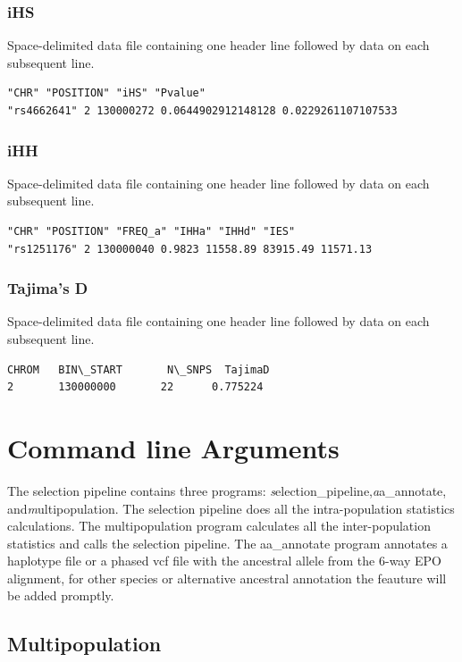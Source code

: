 \subsubsection{iHS}
Space-delimited data file containing one header line followed by data on each subsequent line.\\
\begin{verbatim}
"CHR" "POSITION" "iHS" "Pvalue"
"rs4662641" 2 130000272 0.0644902912148128 0.0229261107107533
\end{verbatim}
\subsubsection{iHH}
Space-delimited data file containing one header line followed by data on each subsequent line.\\
\begin{verbatim}
"CHR" "POSITION" "FREQ_a" "IHHa" "IHHd" "IES"
"rs1251176" 2 130000040 0.9823 11558.89 83915.49 11571.13
\end{verbatim}
\subsubsection{Tajima's D}
Space-delimited data file containing one header line followed by data on each subsequent line.\\
\begin{verbatim}
CHROM   BIN\_START       N\_SNPS  TajimaD
2       130000000       22      0.775224
\end{verbatim}

\section{Command line Arguments}
The selection pipeline contains three programs: \emph selection\_pipeline,\emph aa\_annotate, and\emph multipopulation. The selection pipeline does all the intra-population statistics calculations. The multipopulation program calculates all the inter-population statistics and calls the selection pipeline. The aa\_annotate program annotates a haplotype file or a phased vcf file with the ancestral allele from the 6-way EPO alignment, for other species or alternative ancestral annotation the feauture will be added promptly.
\subsection{Multipopulation}
